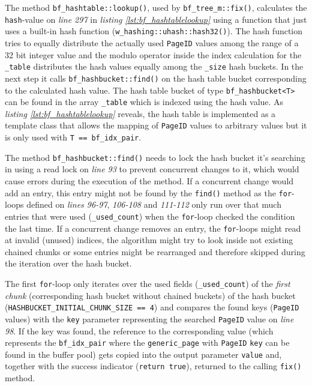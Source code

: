 	The method \lstinline{bf_hashtable::lookup()}, used by \lstinline{bf_tree_m::fix()}, calculates the \lstinline{hash}-value on \emph{line 297} in \emph{listing \ref{lst:bf_hashtablelookup}} using a function that just uses a built-in hash function (\lstinline{w_hashing::uhash::hash32()}). The hash function tries to equally distribute the actually used \lstinline{PageID} values among the range of a 32 bit integer value and the modulo operator inside the index calculation for the \lstinline{_table} distributes the hash values equally among the \lstinline{_size} hash buckets. In the next step it calls \lstinline{bf_hashbucket::find()} on the hash table bucket corresponding to the calculated hash value. The hash table bucket of type \lstinline{bf_hashbucket<T>} can be found in the array \lstinline{_table} which is indexed using the hash value. As  \emph{listing \ref{lst:bf_hashtablelookup}} reveals, the hash table is implemented as a template class that allows the mapping of \lstinline{PageID} values to arbitrary values but it is only used with \lstinline{T == bf_idx_pair}.

	The method \lstinline{bf_hashbucket::find()} needs to lock the hash bucket it's searching in using a read lock on \emph{line 93} to prevent concurrent changes to it, which would cause errors during the execution of the method. If a concurrent change would add an entry, this entry might not be found by the \lstinline{find()} method as the \lstinline{for}-loops defined on \emph{lines 96-97}, \emph{106-108} and \emph{111-112} only run over that much entries that were used (\lstinline{_used_count}) when the \lstinline{for}-loop checked the condition the last time. If a concurrent change removes an entry, the \lstinline{for}-loops might read at invalid (unused) indices, the algorithm might try to look inside not existing chained chunks or some entries might be rearranged and therefore skipped during the iteration over the hash bucket.

	The first \lstinline{for}-loop only iterates over the used fields (\lstinline{_used_count}) of the \emph{first chunk} (corresponding hash bucket without chained buckets) of the hash bucket (\lstinline{HASHBUCKET_INITIAL_CHUNK_SIZE == 4}) and compares the found keys (\lstinline{PageID} values) with the \lstinline{key} parameter representing the searched \lstinline{PageID} value on \emph{line 98}. If the key was found, the reference to the corresponding value (which represents the \lstinline{bf_idx_pair} where the \lstinline{generic_page} with \lstinline{PageID} \lstinline{key} can be found in the buffer pool) gets copied into the output parameter \lstinline{value} and, together with the success indicator (\lstinline{return true}), returned to the calling \lstinline{fix()} method.

